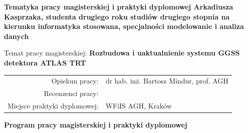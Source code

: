 \documentclass[11pt]{aghdpl}
\begin{document}
\newpage
\mbox{} %


\newpage
{}
\begin{center}
{\bf Tematyka pracy magisterskiej i praktyki dyplomowej Arkadiusza Kasprzaka,
studenta drugiego roku studiów drugiego stopnia na kierunku informatyka stosowana, specjalności modelowanie i analiza danych}\\
\end{center}

Temat pracy magisterskiej:
{\bf Rozbudowa i uaktualnienie systemu GGSS detektora ATLAS TRT}\\

\begin{tabular}{rl}

Opiekun pracy:                  & dr hab. inż. Bartosz Mindur, prof. AGH \\
Recenzenci pracy:               & \\
Miejsce praktyki dyplomowej:    & WFiIS AGH, Kraków\\
\end{tabular}

\begin{center}
{\bf Program pracy magisterskiej i praktyki dyplomowej}
\end{center}
\end{document}
